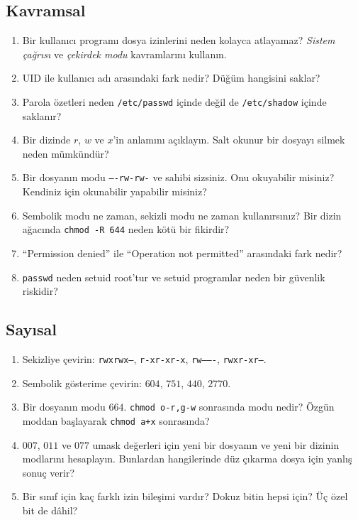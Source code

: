 \documentclass[11pt,a4paper]{article}
\newcommand{\cmd}[1]{\texttt{#1}}
\begin{document}
\subsection*{Kavramsal}
\begin{enumerate}[leftmargin=1.6em]
  \item Bir kullanıcı programı dosya izinlerini neden kolayca atlayamaz? \emph{Sistem çağrısı} ve \emph{çekirdek modu} kavramlarını kullanın.
  \item UID ile kullanıcı adı arasındaki fark nedir? Düğüm hangisini saklar?
  \item Parola özetleri neden \texttt{/etc/passwd} içinde değil de \texttt{/etc/shadow} içinde saklanır?
  \item Bir dizinde $r$, $w$ ve $x$'in anlamını açıklayın. Salt okunur bir dosyayı silmek neden mümkündür?
  \item Bir dosyanın modu \texttt{----rw-rw-} ve sahibi sizsiniz. Onu okuyabilir misiniz? Kendiniz için okunabilir yapabilir misiniz?
  \item Sembolik modu ne zaman, sekizli modu ne zaman kullanırsınız? Bir dizin ağacında \texttt{chmod -R 644} neden kötü bir fikirdir?
  \item ``Permission denied'' ile ``Operation not permitted'' arasındaki fark nedir?
  \item \cmd{passwd} neden setuid root'tur ve setuid programlar neden bir güvenlik riskidir?
\end{enumerate}

\subsection*{Sayısal}
\begin{enumerate}[leftmargin=1.6em,resume]
  \item Sekizliye çevirin: \texttt{rwxrwx---}, \texttt{r-xr-xr-x}, \texttt{rw-------}, \texttt{rwxr-xr--}.
  \item Sembolik gösterime çevirin: $604$, $751$, $440$, $2770$.
  \item Bir dosyanın modu $664$. \texttt{chmod o-r,g-w} sonrasında modu nedir? Özgün moddan başlayarak \texttt{chmod a+x} sonrasında?
  \item $007$, $011$ ve $077$ umask değerleri için yeni bir dosyanın ve yeni bir dizinin modlarını hesaplayın. Bunlardan hangilerinde düz çıkarma dosya için yanlış sonuç verir?
  \item Bir sınıf için kaç farklı izin bileşimi vardır? Dokuz bitin hepsi için? Üç özel bit de dâhil?
\end{enumerate}
\end{document}

